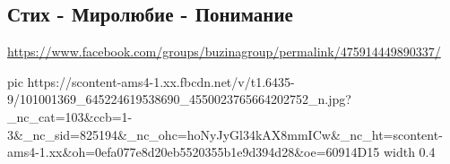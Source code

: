  
 
 
 
 

\subsection{Стих - Миролюбие - Понимание}
\url{https://www.facebook.com/groups/buzinagroup/permalink/475914449890337/}

\ifcmt
  pic https://scontent-ams4-1.xx.fbcdn.net/v/t1.6435-9/101001369_645224619538690_4550023765664202752_n.jpg?_nc_cat=103&ccb=1-3&_nc_sid=825194&_nc_ohc=hoNyJyGl34kAX8mmICw&_nc_ht=scontent-ams4-1.xx&oh=0efa077e8d20eb5520355b1e9d394d28&oe=60914D15
  width 0.4
\fi

